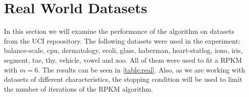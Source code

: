 \section{Real World Datasets}

In this section we will examine the performance of the algorithm on datasets from the UCI repoository. The following datasets were used in the experiment: balance-scale, cpu, dermatology, ecoli, glass, haberman, heart-statlog, iono, iris, segment, tae, thy, vehicle, vowel and zoo. All of them were used to fit a RPKM with $m=6$. The results can be seen in \ref{table:real}. Also, as we are working with datasets of different characteristics, the stopping condition will be used to limit the number of iterations of the RPKM algorithm.

\begin{table}[ht!]
    \centering
\end{table}

